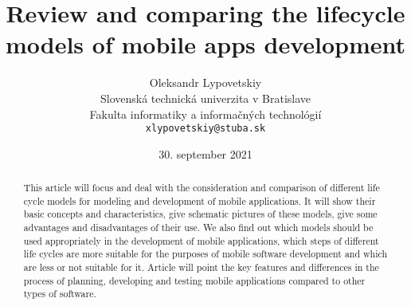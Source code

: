\documentclass[10pt,slovak,a4paper]{article}
\title{Review and comparing the lifecycle models of mobile apps development} %
\author{Oleksandr Lypovetskiy\\[2pt]
	{\small Slovenská technická univerzita v Bratislave}\\
	{\small Fakulta informatiky a informačných technológií}\\
	{\small \texttt{xlypovetskiy@stuba.sk}}
	}
\date{\small 30. september 2021} %
\begin{document}
\maketitle

\begin{abstract}
This article will focus and deal with the consideration and comparison of different life cycle models for modeling and development of mobile applications. It will show their basic concepts and characteristics, give schematic pictures of these models, give some advantages and disadvantages of their use.  We also find out which models should be used appropriately in the development of mobile applications, which steps of different life cycles are more suitable for the purposes of mobile software development and which are less or not suitable for it. Article will point the key features and differences in the process of planning, developing and testing mobile applications compared to other types of software.
\end{abstract}
\end{document}
